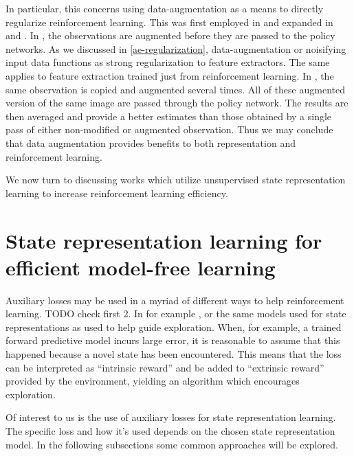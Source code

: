 In particular, this concerns using data-augmentation as a means to directly regularize 
reinforcement learning.
This was first employed in \cite{rad} and expanded in \cite{drqv1}
and \cite{drqv2}.
In \cite{rad}, the observations are augmented before they are passed
to the policy networks. As we discussed in \ref{ae-regularization},
data-augmentation or noisifying input data functions as strong regularization
to feature extractors.
The same applies to feature extraction trained just from reinforcement learning.
In \cite{drqv1}, the same observation is copied and augmented several times.
All of these augmented version of the same image are passed through the policy network.
The results are then averaged and provide a better estimates than 
those obtained by a single pass of either non-modified or augmented observation.
Thus we may conclude that data augmentation provides benefits to both 
representation and reinforcement learning.

We now turn to discussing works which utilize unsupervised state representation learning
to increase reinforcement learning efficiency.

\section{State representation learning for efficient model-free learning}
Auxiliary losses may be used in a myriad of different ways to help reinforcement learning.
TODO check first 2.
In for example \cite{lossisitsownreward}, \cite{rlwauxloss} or \cite{icm}
the same models used for state representations as used to help guide exploration.
When, for example, a trained forward predictive model incurs large error,
it is reasonable to assume that this happened because a novel state has been encountered.
This means that the loss can be interpreted as ``intrinsic reward'' and be added to 
``extrinsic reward'' provided by the environment, yielding an algorithm which 
encourages exploration.

Of interest to us is the use of auxiliary losses for state representation learning.
The specific loss and how it's used depends on the chosen state representation model.
In the following subsections some common approaches will be explored.

